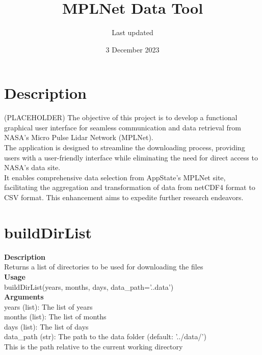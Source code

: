 \documentclass[11pt, oneside]{article}
\title{MPLNet Data Tool}
\author{Last updated}
\date{3 December 2023}
\begin{document}
\newcommand{\modular}[1]{\; \mbox{(mod $#1$)}}
\thispagestyle{empty}
\maketitle
\tableofcontents
\thispagestyle{empty}



\mbox{}
\newpage
\setcounter{page}{1}



\section{Description}
(PLACEHOLDER)
The objective of this project is to develop a functional graphical user interface 
for seamless communication and data retrieval from NASA's Micro Pulse Lidar Network 
(MPLNet). \\

The application is designed to streamline the downloading process, providing 
users with a user-friendly interface while eliminating the need for direct access 
to NASA's data site. \\

It enables comprehensive data selection from AppState's MPLNet 
site, facilitating the aggregation and transformation of data from netCDF4 format 
to CSV format. This enhancement aims to expedite further research endeavors.


\newpage

\section{buildDirList}

\textbf{Description} \\
        Returns a list of directories to be used for downloading the files\\

\noindent\textbf{Usage} \\
        buildDirList(years, months, days, data\_path='..\/data\/') \\

\noindent\textbf{Arguments} \\
        years (list): The list of years\\
        months (list): The list of months\\
        days (list): The list of days\\
        data\_path (str): The path to the data folder (default: '../data/')\\
            This is the path relative to the current working directory\\
\end{document}
